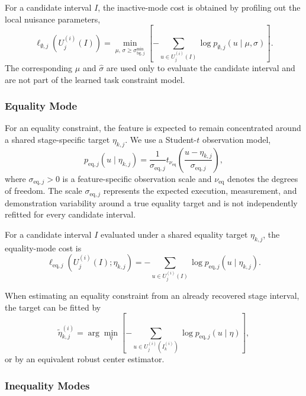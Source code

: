 \documentclass[lettersize,journal]{IEEEtran}
\begin{document}
For a candidate interval $I$, the inactive-mode cost is obtained by profiling out the local nuisance parameters,
\[
\ell_{\emptyset,j}
\left(
U_j^{(i)}(I)
\right)
=
\min_{\mu,\,
\sigma\ge\sigma_{\mathrm{bg},j}^{\min}}
\left[
-\sum_{u\in U_j^{(i)}(I)}
\log
p_{\emptyset,j}
(u\mid\mu,\sigma)
\right].
\]
The corresponding $\widehat{\mu}$ and $\widehat{\sigma}$ are used only to evaluate the candidate interval and are not part of the learned task constraint model.


\subsubsection{Equality Mode}

For an equality constraint, the feature is expected to remain concentrated around a shared stage-specific target $\eta_{k,j}$. We use a Student-$t$ observation model,
\[
p_{\mathrm{eq},j}
\left(
u\mid\eta_{k,j}
\right)
=
\frac{1}{\sigma_{\mathrm{eq},j}}
t_{\nu_{\mathrm{eq}}}
\left(
\frac{u-\eta_{k,j}}
{\sigma_{\mathrm{eq},j}}
\right),
\]
where $\sigma_{\mathrm{eq},j}>0$ is a feature-specific observation scale and $\nu_{\mathrm{eq}}$ denotes the degrees of freedom. The scale $\sigma_{\mathrm{eq},j}$ represents the expected execution, measurement, and demonstration variability around a true equality target and is not independently refitted for every candidate interval.

For a candidate interval $I$ evaluated under a shared equality target $\eta_{k,j}$, the equality-mode cost is
\[
\ell_{\mathrm{eq},j}
\left(
U_j^{(i)}(I);
\eta_{k,j}
\right)
=
-\sum_{u\in U_j^{(i)}(I)}
\log
p_{\mathrm{eq},j}
\left(
u\mid\eta_{k,j}
\right).
\]

When estimating an equality constraint from an already recovered stage interval, the target can be fitted by
\[
\widetilde{\eta}_{k,j}^{(i)}
=
\arg\min_{\eta}
\left[
-\sum_{u\in U_j^{(i)}(I_k^{(i)})}
\log
p_{\mathrm{eq},j}
(u\mid\eta)
\right],
\]
or by an equivalent robust center estimator.

\subsubsection{Inequality Modes}
\end{document}
